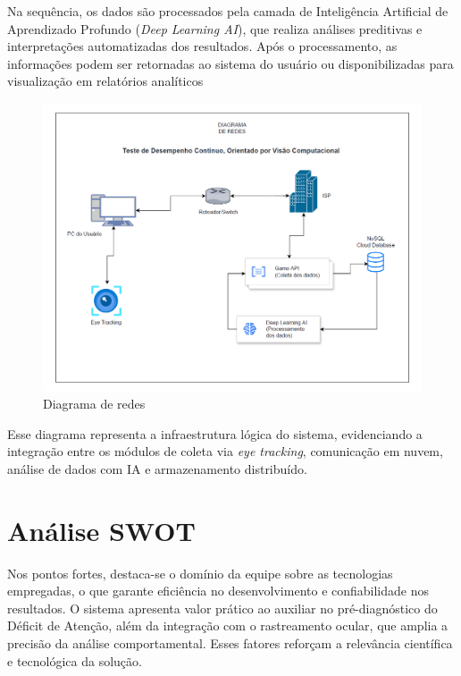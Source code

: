\documentclass[
  a4paper,%
  12pt,%
  english,%
  brazilian,%
]{article}
\begin{document}
    Na sequência, os dados são processados pela camada de Inteligência Artificial de Aprendizado Profundo (\textit{Deep Learning AI}), que realiza análises preditivas e interpretações automatizadas dos resultados. Após o processamento, as informações podem ser retornadas ao sistema do usuário ou disponibilizadas para visualização em relatórios analíticos

\begin{figure}[H]
\centering
\caption{Diagrama de redes}%
\label{fig:diagrama-de-redes}
\includegraphics[width=1.1\textwidth]{Logos/diagrama-de-redes.png}
\end{figure}

    Esse diagrama representa a infraestrutura lógica do sistema, evidenciando a integração entre os módulos de coleta via \textit{eye tracking}, comunicação em nuvem, análise de dados com IA e armazenamento distribuído.

\section*{Análise SWOT}

Nos pontos fortes, destaca-se o domínio da equipe sobre as tecnologias empregadas, o que garante eficiência no desenvolvimento e confiabilidade nos resultados. O sistema apresenta valor prático ao auxiliar no pré-diagnóstico do Déficit de Atenção, além da integração com o rastreamento ocular, que amplia a precisão da análise comportamental. Esses fatores reforçam a relevância científica e tecnológica da solução.
\end{document}
